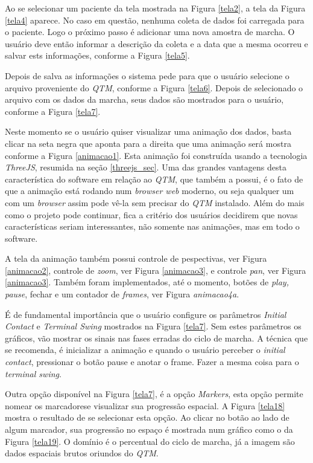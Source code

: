Ao se selecionar um paciente da tela mostrada na Figura \ref{tela2}, a tela da Figura \ref{tela4} aparece. No caso em questão, nenhuma coleta de dados foi carregada para o paciente. Logo o próximo passo é adicionar uma nova amostra de marcha.
O usuário deve então informar a descrição da coleta e a data que a mesma ocorreu e salvar ests informações, conforme a Figura \ref{tela5}.


Depois de salva as informações o sistema pede para que o usuário selecione o arquivo proveniente do \emph{QTM}, conforme a Figura \ref{tela6}.
Depois de selecionado o arquivo com os dados da marcha, seus dados são mostrados para o usuário, conforme a Figura \ref{tela7}.


Neste momento se o usuário quiser visualizar uma animação dos dados, basta clicar na seta negra que aponta para a direita que uma animação será mostra conforme a Figura \ref{animacao1}.
Esta animação foi construída usando a tecnologia \emph{ThreeJS}, resumida na seção \ref{threejs_sec}. Uma das grandes vantagens desta característica do software em relação ao \emph{QTM}, que também a possui, é o fato de que a animação está rodando num \emph{browser web} moderno, ou seja qualquer um com um \emph{browser} assim pode vê-la sem precisar do \emph{QTM} instalado. 
Além do mais como o projeto pode continuar, fica a critério dos usuários decidirem que novas características seriam interessantes, não somente nas animações, mas em todo o software.

A tela da animação também possui controle de pespectivas, ver Figura \ref{animacao2}, controle de \emph{zoom}, ver Figura \ref{animacao3}, e controle \emph{pan}, ver Figura \ref{animacao3}.
Também foram implementados, até o momento, botões de \emph{play, pause}, fechar e um contador de \emph{frames}, ver Figura \emph{animacao4a}.




É de fundamental importância que o usuário configure os parâmetros \emph{Initial Contact} e \emph{Terminal Swing} mostrados na Figura \ref{tela7}. Sem estes parâmetros os gráficos, vão mostrar os sinais nas fases erradas do ciclo de marcha.
A técnica que se recomenda, é inicializar a animação e quando o usuário perceber o \emph{initial contact}, pressionar o botão pause e anotar o frame. Fazer a mesma coisa para o \emph{terminal swing}.

Outra opção disponível na Figura \ref{tela7}, é a opção \emph{Markers}, esta opção permite nomear os marcadorese visualizar sua progressão espacial. A Figura \ref{tela18} mostra o resultado de se selecionar esta opção.
Ao clicar no botão ao lado de algum marcador, sua progressão no espaço é mostrada num gráfico como o da Figura \ref{tela19}. O domínio é o percentual do ciclo de marcha, já a imagem são dados espaciais brutos oriundos do \emph{QTM}.

